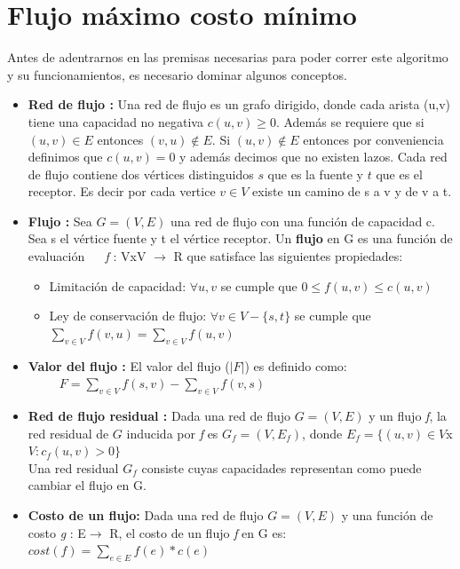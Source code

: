 \documentclass[sn-mathphys,Numbered]{sn-jnl}%
\theoremstyle{thmstyleone}%
\theoremstyle{thmstyletwo}%
\theoremstyle{thmstylethree}%
\begin{document}
\section{Flujo m\'aximo costo m\'inimo}
Antes de adentrarnos en las premisas necesarias para poder correr este algoritmo y su funcionamientos, es necesario dominar algunos conceptos.
\begin{itemize}
    \item \textbf{Red de flujo :} Una red de flujo es un grafo dirigido, donde cada arista (u,v) tiene una capacidad no negativa $c(u,v) \geq 0$. Además se requiere que si $(u,v) \in E $ entonces $(v,u) \notin E$. Si $(u,v) \notin E $ entonces por conveniencia definimos que $c(u,v) = 0$ y además decimos que no existen lazos. Cada red de flujo contiene dos vértices distinguidos $s$ que es la fuente y $t$ que es el receptor. Es decir por cada vertice $v\in V$ existe un camino de s a v y de v a t\cite{1}.\\
    \item \textbf{Flujo :}\cite{2} Sea $G = (V,E)$ una red de flujo con una funci\'on de capacidad c. Sea s el vértice fuente y t el vértice receptor. Un \textbf{flujo} en G es una funci\'on de evaluaci\'on ~~ \textit{f} : VxV $\rightarrow$ R que satisface las siguientes propiedades:
    \begin{itemize}
        \item Limitación de capacidad: $\forall u,v $ se cumple que  $0 \leq f(u,v) \leq c(u,v)$
        \item Ley de conservación de flujo: $\forall v \in V -\{s,t\}$ se cumple que $\sum_{v\in V}f(v,u) = \sum_{v\in V}f(u,v)$
    \end{itemize}
    \item \textbf{Valor del flujo :}\cite{2} El valor del flujo ($|F|$) es definido como:\\
    ~~~~~$F = \sum_{v\in V}f(s,v) - \sum_{v\in V}f(v,s)$
    \item \textbf{Red de flujo residual :}\cite{3} Dada una red de flujo $G=(V,E)$ y un flujo \textit{f}, la red residual de $G$ inducida por \textit{f} es $G_f=(V,E_f)$, donde $E_f = \{(u,v)\in V$x$V :c_f(u,v) > 0\}$\\
    Una red residual $G_f$ consiste cuyas capacidades representan como puede cambiar el flujo en G.
    \item \textbf{Costo de un flujo:} Dada una red de flujo $G = (V,E)$ y una función de costo \textit{g} : E$\rightarrow$ R, el costo de un flujo \textit{f} en G es:\\
    $cost(f) = \sum_{e\in E}f(e)*c(e)$
\end{itemize}
\end{document}
